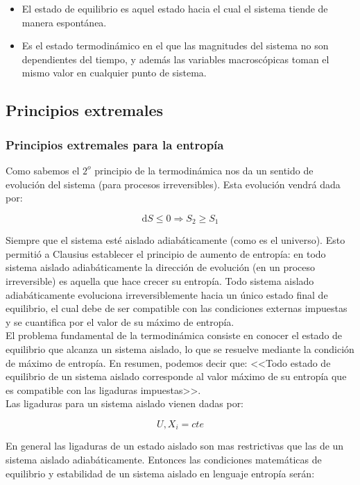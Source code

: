 \documentclass[12pt,a4paper]{article}
\newcommand{\D}{\mathrm{d}}
\begin{document}
\begin{itemize}
\item El estado de equilibrio es aquel estado hacia el cual el sistema tiende de manera espontánea.
\item Es el estado termodinámico en el que las magnitudes del sistema no son dependientes del tiempo, y además las variables macroscópicas toman el mismo valor en cualquier punto de sistema.
\end{itemize}                  

\subsection{Principios extremales}
\subsubsection{Principios extremales para la entropía}

Como sabemos el $2^o$ principio de la termodinámica nos da un sentido de evolución del sistema (para procesos irreversibles). Esta evolución vendrá dada por:

$$ \D S \leq  0 \Longrightarrow S_2 \geq S_1 $$

Siempre que el sistema esté aislado adiabáticamente (como es el universo). Esto permitió a Clausius establecer el principio de aumento de entropía: en todo sistema aislado adiabáticamente la dirección de evolución (en un proceso irreversible) es aquella que hace crecer su entropía. Todo sistema aislado adiabáticamente evoluciona irreversiblemente hacia un único estado final de equilibrio, el cual debe de ser compatible con las condiciones externas impuestas y se cuantifica por el valor de su máximo de entropía. \\

El problema fundamental de la termodinámica consiste en conocer el estado de equilibrio que alcanza un sistema aislado, lo que se resuelve mediante la condición de máximo de entropía. En resumen, podemos decir que: <<Todo estado de equilibrio de un sistema aislado corresponde al valor máximo de su entropía que es compatible con las ligaduras impuestas>>. \\

Las ligaduras para un sistema aislado vienen dadas por:

$$ U, X_i = cte $$

En general las ligaduras de un estado aislado son mas restrictivas que las de un sistema aislado adiabáticamente. Entonces las condiciones matemáticas de equilibrio y estabilidad de un sistema aislado en lenguaje entropía serán:
\end{document}
